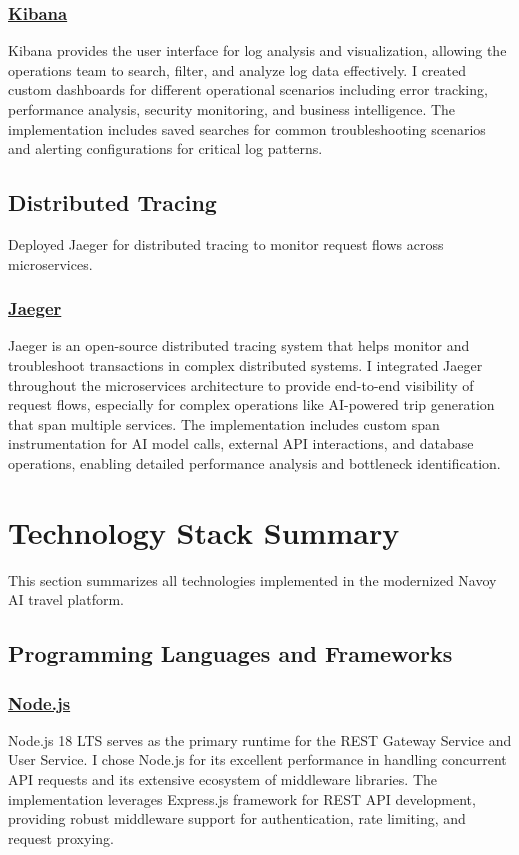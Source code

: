 \subsubsection*{\underline{Kibana}}
Kibana provides the user interface for log analysis and visualization, allowing the operations team to search, filter, and analyze log data effectively. I created custom dashboards for different operational scenarios including error tracking, performance analysis, security monitoring, and business intelligence. The implementation includes saved searches for common troubleshooting scenarios and alerting configurations for critical log patterns.

\subsection{Distributed Tracing}
Deployed Jaeger for distributed tracing to monitor request flows across microservices.

\subsubsection*{\underline{Jaeger}}
Jaeger is an open-source distributed tracing system that helps monitor and troubleshoot transactions in complex distributed systems. I integrated Jaeger throughout the microservices architecture to provide end-to-end visibility of request flows, especially for complex operations like AI-powered trip generation that span multiple services. The implementation includes custom span instrumentation for AI model calls, external API interactions, and database operations, enabling detailed performance analysis and bottleneck identification.

\section{Technology Stack Summary}
This section summarizes all technologies implemented in the modernized Navoy AI travel platform.

\subsection{Programming Languages and Frameworks}

\subsubsection*{\underline{Node.js}}
Node.js 18 LTS serves as the primary runtime for the REST Gateway Service and User Service. I chose Node.js for its excellent performance in handling concurrent API requests and its extensive ecosystem of middleware libraries. The implementation leverages Express.js framework for REST API development, providing robust middleware support for authentication, rate limiting, and request proxying.

